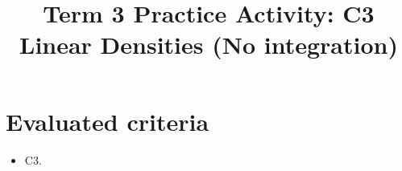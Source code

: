 \makeatletter
{}
\makeatother	



\usepackage{pgfplots}
\pgfplotsset{compat=1.18}

\title{Term 3 Practice Activity: C3 Linear Densities (No integration)}
\author{}
\date{}


	\maketitle

	\setcounter{tocdepth}{1}
	\setcounter{secnumdepth}{2}
	\tableofcontents

	\section*{Evaluated criteria}
	\begin{itemize}
		\item C3.
	\end{itemize}


\newcommand{\LinearProbGraph}[6]{
\begin{center}
\begin{tikzpicture}
\pgfmathsetmacro{\supportA}{#1}
\pgfmathsetmacro{\supportB}{#2}
\pgfmathsetmacro{\pad}{0.12*(\supportB-\supportA)}
\begin{axis}[
  width=9cm,
  height=5cm,
  axis lines=left,
  xlabel={$x$},
  ylabel={$f(x)$},
  xmin={\supportA-\pad},
  xmax={\supportB+\pad},
  ymin=0,
  ymax=0.45,
  grid=both,
  xtick={#6}
]
\addplot[domain=#1:#2, samples=150, draw=none, fill=blue!20, fill opacity=0.35] {#3} \closedcycle;
\addplot[domain=#4:#5, samples=150, draw=none, fill=blue!60, fill opacity=0.55] {#3} \closedcycle;
\addplot[smooth, domain=#1:#2, samples=150] {#3};
\end{axis}
\end{tikzpicture}
\end{center}
}

\newcommand{\PiecewiseProbGraph}[6]{
\begin{center}
\begin{tikzpicture}
\pgfmathsetmacro{\supportA}{#1}
\pgfmathsetmacro{\supportB}{#2}
\pgfmathsetmacro{\pad}{0.12*(\supportB-\supportA)}
\begin{axis}[
  width=9cm,
  height=5cm,
  axis lines=left,
  xlabel={$x$},
  ylabel={$f(x)$},
  xmin={\supportA-\pad},
  xmax={\supportB+\pad},
  ymin=0,
  ymax=0.45,
  grid=both,
  xtick={#6}
]
\addplot[domain=#1:#2, samples=200, draw=none, fill=blue!20, fill opacity=0.35] {#3} \closedcycle;
\addplot[domain=#4:#5, samples=200, draw=none, fill=blue!60, fill opacity=0.55] {#3} \closedcycle;
\addplot[smooth, domain=#1:#2, samples=200] {#3};
\end{axis}
\end{tikzpicture}
\end{center}
}

